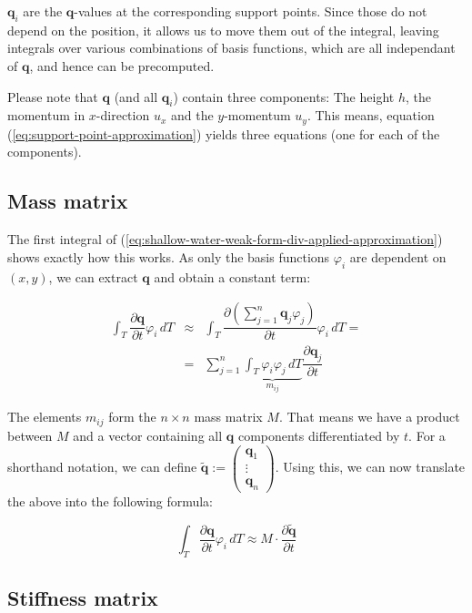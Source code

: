 \documentclass{article}
\newcommand{\pd}[2]{\dfrac{\partial #1}{\partial #2}}
\renewcommand{\phi}{\varphi}
\begin{document}
$\mathbf{q}_i$ are the $\mathbf{q}$-values at the corresponding support points. Since those do not depend on the position, it allows us to move them out of the integral, leaving integrals over various combinations of basis functions, which are all independant of $\mathbf{q}$, and hence can be precomputed.

Please note that $\mathbf{q}$ (and all $\mathbf{q}_i$) contain three components: The height $h$, the momentum in $x$-direction $u_x$ and the $y$-momentum $u_y$. This means, equation (\ref{eq:support-point-approximation}) yields three equations (one for each of the components).

\subsection{Mass matrix}
\label{sec:mass-matrix}

The first integral of (\ref{eq:shallow-water-weak-form-div-applied-approximation}) shows exactly how this works. As only the basis functions $\phi_i$ are dependent on $(x,y)$, we can extract $\mathbf{q}$ and obtain a constant term:

\begin{eqnarray*}
  \int_T \pd {\mathbf{q}}{t} \phi_i \, dT & \approx &
  \int_T \pd {\left( \sum_{j=1}^n \mathbf{q}_j \phi_j \right) }{t} \phi_i \, dT = \\
  & = & \sum_{j=1}^n \underbrace{\int_T \phi_i \phi_j \, dT}_{m_{ij}} \pd{\mathbf{q}_j}{t}
\end{eqnarray*}

The elements $m_{ij}$ form the $n \times n$ mass matrix $M$. That means we have a product between $M$ and a vector containing all $\mathbf{q}$ components differentiated by $t$. For a shorthand notation, we can define $\tilde{\mathbf{q}} := \begin{pmatrix} \mathbf{q}_1 \\ \vdots \\ \mathbf{q}_n \end{pmatrix}$. Using this, we can now translate the above into the following formula:

\begin{equation*}
  \int_T \pd {\mathbf{q}}{t} \phi_i \, dT \approx
  M \cdot \pd{
    \tilde{\mathbf{q}}}{t}
\end{equation*}

\subsection{Stiffness matrix}
\label{sec:stiffness-matrix}
\end{document}
